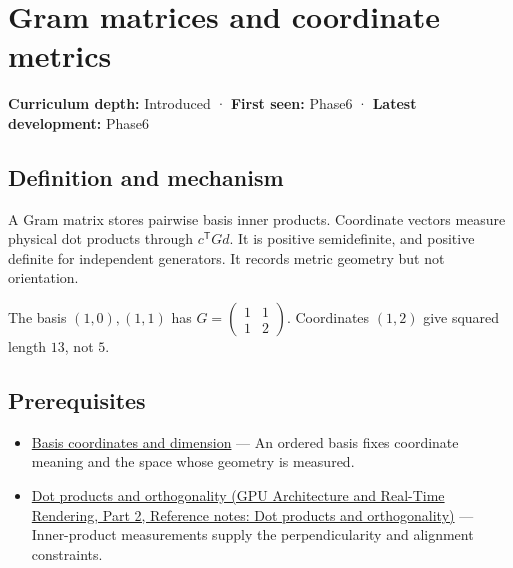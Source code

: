\hypertarget{appendix-3b863809f82a}{}\label{referencestart:appendix-3b863809f82a}
\section{Gram matrices and coordinate metrics}\label{appendix-3b863809f82a-gram-matrices-and-coordinate-metrics}

\hypertarget{appendix-3b863809f82a-gram-matrices-and-coordinate-metrics}{}

\textbf{Curriculum depth:} Introduced · \textbf{First seen:} Phase6 · \textbf{Latest development:} Phase6

\begin{allmightroledefinition}

\subsection{Definition and mechanism}\label{appendix-3b863809f82a-definition-and-mechanism}

\hypertarget{appendix-3b863809f82a-definition-and-mechanism}{}

A Gram matrix stores pairwise basis inner products. Coordinate vectors measure physical dot products through \(c^\mathsf TGd\). It is positive semidefinite, and positive definite for independent generators. It records metric geometry but not orientation.

\end{allmightroledefinition}

The basis \((1,0),(1,1)\) has \(G=\begin{pmatrix}1&1\\1&2\end{pmatrix}\). Coordinates \((1,2)\) give squared length \(13\), not \(5\).

\subsection{Prerequisites}\label{appendix-3b863809f82a-prerequisites}

\hypertarget{appendix-3b863809f82a-prerequisites}{}

\begin{itemize}
\tightlist
\item
  \hyperref[appendix-ce0341f7ea0d]{Basis coordinates and dimension} --- An ordered basis fixes coordinate meaning and the space whose geometry is measured.
\item
  \href{../06-GPU-Architecture-and-Real-Time-Rendering-P02/main.pdf\#nameddest=appendix-8bc4e8fc547c}{Dot products and orthogonality (GPU Architecture and Real-Time Rendering, Part 2, Reference notes: Dot products and orthogonality)} --- Inner-product measurements supply the perpendicularity and alignment constraints.
\end{itemize}


